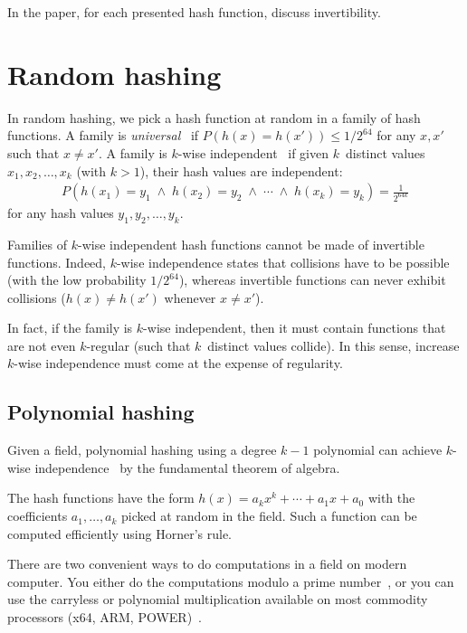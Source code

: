 \documentclass{article}
\begin{document}
In the paper, for each presented hash function, discuss invertibility.





\section{Random hashing}


In random hashing, 
we pick a hash function  at random in a family of
hash functions.  A family  is
  \emph{universal}~\cite{carter1979universal} if
 $P\left (h(x)=h(x')\right )\leq 1/2^{64}$
for any $x,x'$ such that $x \neq x'$.
A family is $k$-wise independent~\cite{lemi:one-pass-journal,Lemire2012604} if given  $k$~distinct values $x_1,x_2, \ldots, x_k$ (with $k>1$), their hash
values are independent: \begin{eqnarray*}
P\left (h(x_1)= y_1  \; \land  \; h(x_2)= y_2 \; \land  \; \cdots \; \land  \; h(x_k)= y_k  \right ) =\frac{1}{2^{64k}}\end{eqnarray*}
for any hash values $y_1,y_2,\ldots, y_k$. 


Families of $k$-wise independent hash functions cannot be made of invertible functions. Indeed, $k$-wise independence states that collisions have to be possible (with the low probability $1/2^{64}$), whereas invertible functions can never exhibit collisions ($h(x) \neq h(x')$ whenever $x\neq x'$).

In fact, if the family is $k$-wise independent, then it must contain functions that are not even $k$-regular (such that $k$~distinct values collide). In this sense, increase $k$-wise independence must come at the expense of regularity.

\subsection{Polynomial hashing}
Given a field, polynomial hashing using a degree $k-1$ polynomial can achieve $k$-wise independence~\cite{carter1979universal,Thorup:2004:TBH:982792.982884} by the fundamental theorem of algebra.

The hash functions have the form $h(x)=a_{k} x^{k} + \cdots + a_{1} x + a_0$ with the coefficients $a_1, \ldots, a_k$ picked at random in the field. Such a function can be computed efficiently using Horner's rule.

There are two convenient ways to do computations in a field on modern computer. You either do the computations modulo a prime number~\cite{carter1979universal,Thorup:2004:TBH:982792.982884}, or you can use the carryless or polynomial multiplication available on most commodity processors (x64, ARM, POWER)~\cite{Lemire2016}.
\end{document}
